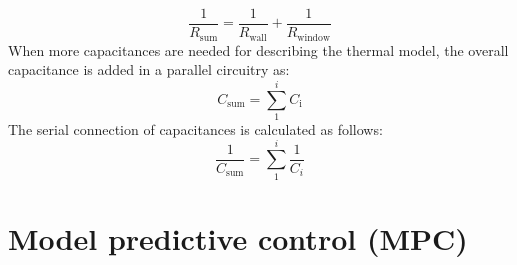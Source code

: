     \begin{equation}
    \label{eq:resistancesparallel}
        \frac{1}{R_\text{sum}} = \frac{1}{R_\text{wall}} + \frac{1}{R_\text{window}}
    \end{equation}
    When more capacitances are needed for describing the thermal model, the overall capacitance is added in a parallel circuitry as: 
    \begin{equation}
    \label{eq:capacityparallel}
        C_\text{sum} = \sum \limits_1^i C_\text{i} 
    \end{equation}
    The serial connection of capacitances is calculated as follows:
    \begin{equation}
    \label{eq:capacityseriell}
       \frac{1}{C_\text{sum}} = \sum \limits_1^i \frac{1}{C_i} 
    \end{equation}
    


\section{Model predictive control (MPC)}
\label{section:mpc}

